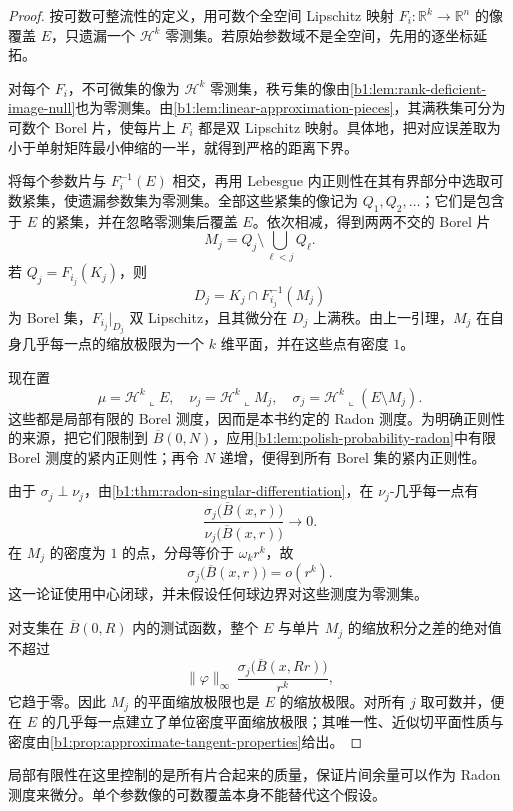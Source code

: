 \begin{proof}
按可数可整流性的定义，用可数个全空间 Lipschitz 映射 \(F_i:\mathbb R^k\rightarrow\mathbb R^n\) 的像覆盖 \(E\)，只遗漏一个 \(\mathcal H^k\) 零测集。若原始参数域不是全空间，先用的逐坐标延拓。

对每个 \(F_i\)，不可微集的像为 \(\mathcal H^k\) 零测集，秩亏集的像由\cref{b1:lem:rank-deficient-image-null}也为零测集。由\cref{b1:lem:linear-approximation-pieces}，其满秩集可分为可数个 Borel 片，使每片上 \(F_i\) 都是双 Lipschitz 映射。具体地，把对应误差取为小于单射矩阵最小伸缩的一半，就得到严格的距离下界。

将每个参数片与 \(F_i^{-1}(E)\) 相交，再用 Lebesgue 内正则性在其有界部分中选取可数紧集，使遗漏参数集为零测集。全部这些紧集的像记为 \(Q_1,Q_2,\ldots\)；它们是包含于 \(E\) 的紧集，并在忽略零测集后覆盖 \(E\)。依次相减，得到两两不交的 Borel 片
\[
 M_j=Q_j\setminus\bigcup_{\ell<j}Q_\ell.
\]
若 \(Q_j=F_{i_j}(K_j)\)，则
\[
 D_j=K_j\cap F_{i_j}^{-1}(M_j)
\]
为 Borel 集，\(F_{i_j}|_{D_j}\) 双 Lipschitz，且其微分在 \(D_j\) 上满秩。由上一引理，\(M_j\) 在自身几乎每一点的缩放极限为一个 \(k\) 维平面，并在这些点有密度 \(1\)。

现在置
\[
 \mu=\mathcal H^k\llcorner E,\quad
 \nu_j=\mathcal H^k\llcorner M_j,\quad
 \sigma_j=\mathcal H^k\llcorner(E\setminus M_j).
\]
这些都是局部有限的 Borel 测度，因而是本书约定的 Radon 测度。为明确正则性的来源，把它们限制到 \(\overline B(0,N)\)，应用\cref{b1:lem:polish-probability-radon}中有限 Borel 测度的紧内正则性；再令 \(N\) 递增，便得到所有 Borel 集的紧内正则性。

由于 \(\sigma_j\perp\nu_j\)，由\cref{b1:thm:radon-singular-differentiation}，在 \(\nu_j\)-几乎每一点有
\[
 \frac{\sigma_j\bigl(\overline B(x,r)\bigr)}
      {\nu_j\bigl(\overline B(x,r)\bigr)}
 \longrightarrow0.
\]
在 \(M_j\) 的密度为 \(1\) 的点，分母等价于 \(\omega_k r^k\)，故
\[
 \sigma_j\bigl(\overline B(x,r)\bigr)=o(r^k).
\]
这一论证使用中心闭球，并未假设任何球边界对这些测度为零测集。

对支集在 \(\overline B(0,R)\) 内的测试函数，整个 \(E\) 与单片 \(M_j\) 的缩放积分之差的绝对值不超过
\[
 \|\varphi\|_\infty\,
 \frac{\sigma_j\bigl(\overline B(x,Rr)\bigr)}{r^k},
\]
它趋于零。因此 \(M_j\) 的平面缩放极限也是 \(E\) 的缩放极限。对所有 \(j\) 取可数并，便在 \(E\) 的几乎每一点建立了单位密度平面缩放极限；其唯一性、近似切平面性质与密度由\cref{b1:prop:approximate-tangent-properties}给出。
\end{proof}

局部有限性在这里控制的是所有片合起来的质量，保证片间余量可以作为 Radon 测度来微分。单个参数像的可数覆盖本身不能替代这个假设。

